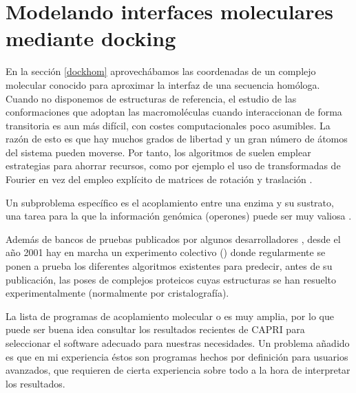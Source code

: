 
\section{Modelando interfaces moleculares mediante docking}

En la secci\'{o}n \ref{dockhom} aprovech\'{a}bamos las coordenadas de un complejo molecular conocido
para aproximar la interfaz de una secuencia hom\'{o}loga. Cuando no disponemos de estructuras 
de referencia, el estudio de las conformaciones que adoptan las macromol\'{e}culas cuando interaccionan 
de forma transitoria es aun m\'{a}s dif\'{i}cil, con costes computacionales poco asumibles.
La raz\'{o}n de esto es que hay muchos grados de libertad y un gran n\'{u}mero de \'{a}tomos del sistema pueden moverse. 
Por tanto, los algoritmos de  
suelen emplear estrategias para ahorrar recursos, como por ejemplo el uso de transformadas de Fourier en vez del empleo 
expl\'{i}cito de matrices de rotaci\'{o}n y traslaci\'{o}n \citep{Katchalski1992}.

Un subproblema espec\'{i}fico es el acoplamiento entre una enzima y su sustrato, una tarea para la que la informaci\'{o}n
gen\'{o}mica (operones) puede ser muy valiosa \citep{Zhao2013}.

Adem\'{a}s de bancos de pruebas publicados por algunos desarrolladores \citep{Yu2016}, 
desde el a\~no 2001 hay en marcha un experimento colectivo () 
donde regularmente se ponen a prueba los diferentes algoritmos existentes
para predecir, antes de su publicaci\'{o}n, las poses de complejos proteicos cuyas estructuras se han resuelto experimentalmente 
(normalmente por cristalograf\'{i}a).  

La lista de programas de acoplamiento molecular o  es muy amplia, por lo que puede ser buena idea consultar los resultados recientes de CAPRI para seleccionar el software adecuado 
para nuestras necesidades. Un problema a\~nadido es que en mi experiencia \'{e}stos son programas 
hechos por definici\'{o}n para usuarios avanzados, que requieren de cierta experiencia sobre todo a la hora de interpretar los resultados.

